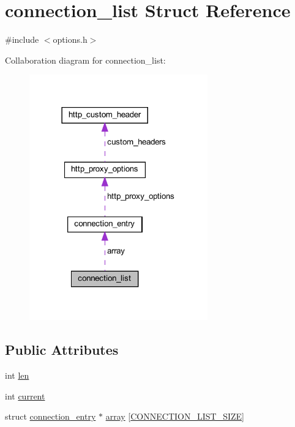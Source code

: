 \hypertarget{structconnection__list}{}\section{connection\+\_\+list Struct Reference}
\label{structconnection__list}


{\ttfamily \#include $<$options.\+h$>$}



Collaboration diagram for connection\+\_\+list\+:
\nopagebreak
\begin{figure}[H]
\begin{center}
\leavevmode
\includegraphics[width=218pt]{structconnection__list__coll__graph}
\end{center}
\end{figure}
\subsection*{Public Attributes}
\begin{DoxyCompactItemize}
\item 
int \hyperlink{structconnection__list_a7ec9bc2e47f7ac458a6a1ae17d0cf304}{len}
\item 
int \hyperlink{structconnection__list_a4c93ccd743bba6ee89f05abc2b3008b0}{current}
\item 
struct \hyperlink{structconnection__entry}{connection\+\_\+entry} $\ast$ \hyperlink{structconnection__list_a57ecc9c713fcb3c347253dd3d86308b5}{array} \mbox{[}\hyperlink{options_8h_a44d71253f2f8bdb9d87329f0d6eedce2}{C\+O\+N\+N\+E\+C\+T\+I\+O\+N\+\_\+\+L\+I\+S\+T\+\_\+\+S\+I\+Z\+E}\mbox{]}
\end{DoxyCompactItemize}


